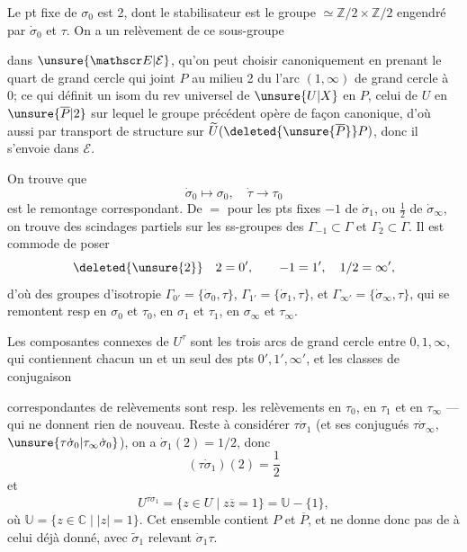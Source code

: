 Le  pt fixe de $\sigma_0$ est 2, dont le stabilisateur est le groupe $\simeq\mathbb Z/2\times\mathbb Z/2$ engendré par $\dot\sigma_0$ et $\tau$. On a un relèvement de ce sous-groupe

dans $\unsure{\mathscr E|\mathcal E}$, qu'on peut choisir canoniquement en prenant le quart de grand cercle qui joint $P$ au milieu 2 du  l'arc $(1,\infty)$ de grand cercle  à 0; ce qui définit un isom du rev universel de $\unsure{U|X}$ en $P$,  celui de $U$ en $\unsure{\overline P|2}$ sur lequel le groupe précédent opère de façon canonique, d'où aussi par transport de structure sur $\widetilde U(\deleted{\unsure{\overline P}}P)$, donc il s'envoie dans $\mathscr E$.

On trouve que
\[
\dot\sigma_0\mapsto\sigma_0,\quad\dot\tau\to\tau_0
\]
est le remontage correspondant. De $=$ pour les pts fixes $-1$ de $\dot\sigma_1$, ou $\frac12$ de $\dot\sigma_\infty$, on trouve des scindages partiels sur les ss-groupes des   $\Gamma_{-1}\subset\Gamma$ et $\Gamma_2\subset\Gamma$. Il est commode de poser
\[
\deleted{\unsure{2}}\quad 2=0',\qquad -1=1',\quad 1/2=\infty',
\]
d'où des groupes d'isotropie $\Gamma_{0'}=\{\dot\sigma_0,\tau\}$, $\Gamma_{1'}=\{\dot\sigma_1,\tau\}$, et $\Gamma_{\infty'}=\{\dot\sigma_\infty,\tau\}$, qui se remontent resp en $\sigma_0$ et $\tau_0$, en $\sigma_1$ et $\tau_1$, en $\sigma_\infty$ et $\tau_\infty$.

Les composantes connexes de $U^\tau$ sont les trois arcs de grand cercle entre $0,1,\infty$, qui contiennent chacun un  et un seul des pts $0',1',\infty'$, et les classes de conjugaison

correspondantes de relèvements  sont resp. les relèvements en $\tau_0$, en $\tau_1$ et en $\tau_\infty$ --- qui ne donnent rien de nouveau. Reste à considérer $\tau\dot\sigma_1$ (et ses conjugués  $\tau\dot\sigma_\infty$, $\unsure{\tau\dot\sigma_0|\tau_\infty\dot\sigma_0}$), on a $\dot\sigma_1(2)=1/2$, donc
\[
(\tau\dot\sigma_1)(2)=\frac12
\]
et
\[
U^{\tau\dot\sigma_1}=\{z\in U\mid z\overline z=1\}=\mathbb U-\{1\},
\]
où $\mathbb U=\{z\in\mathbb C\mid |z|=1\}$. Cet ensemble contient $P$ et $\overline P$, et ne donne donc pas de    à celui déjà donné, avec $\widetilde\sigma_1$ relevant $\dot\sigma_1\tau$.

